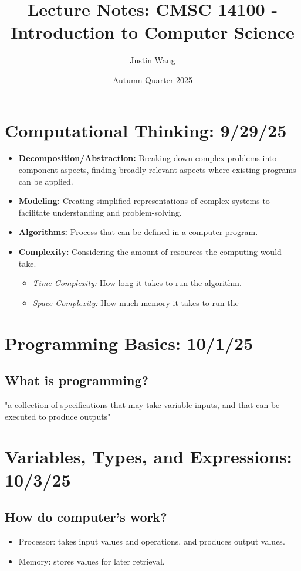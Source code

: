 \documentclass[11pt]{article}
\title{Lecture Notes: CMSC 14100 - Introduction to Computer Science}
\author{Justin Wang}
\date{Autumn Quarter 2025}
\begin{document}
\maketitle

\section{Computational Thinking: 9/29/25}
\begin{itemize}
    \item \textbf{Decomposition/Abstraction:} Breaking down complex problems into component aspects, finding broadly relevant aspects where existing programs can be applied.
    \item \textbf{Modeling:} Creating simplified representations of complex systems to facilitate understanding and problem-solving.
    \item  \textbf{Algorithms:} Process that can be defined in a computer program.
    \item \textbf{Complexity:} Considering the amount of resources the computing would take. \begin{itemize}
        \item \textit{Time Complexity:} How long it takes to run the algorithm.
        \item \textit{Space Complexity:} How much memory it takes to run the
         \end{itemize}
\end{itemize}

\section{Programming Basics: 10/1/25}

\subsection{What is programming?}
\begin{center}
    "a collection of specifications that may take variable inputs, and that can be executed to produce outputs"
\end{center}

\section{Variables, Types, and Expressions: 10/3/25}
\subsection{How do computer's work?}
\begin{itemize}
    \item Processor: takes input values and operations, and produces output values.
    \item Memory: stores values for later retrieval.
\end{itemize}
\newpage
\end{document}
